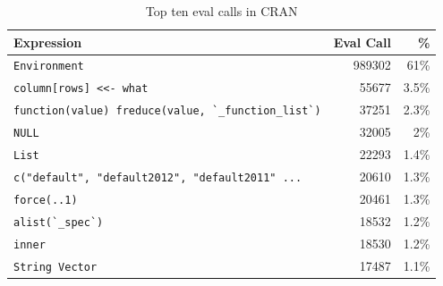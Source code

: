 \documentclass[a4paper,USenglish,cleveref, autoref, thm-restate]{lipics-v2019}
\renewcommand{\c}[1]{\lstinline{#1}\xspace}
\begin{document}
\begin{table}[!h]  \centering
\begin{tabular}{@{}l@{~}|@{~}r@{~}r@{}} \hline
Expression & Eval Call &  \% \\\hline
\c{Environment} &                                  989302   & 61\%\\
\c{column[rows] <<- what} &                        55677    & 3.5\%\\
\c{function(value) freduce(value, `_function_list`)} & 37251& 2.3\%\\
\c{NULL} &                         32005    & 2\%\\
\c{List} &                         22293    & 1.4\%\\
\c{c("default", "default2012", "default2011" ...}& 20610    & 1.3\%\\
\c{force(..1)}            &                        20461    & 1.3\%\\
\c{alist(`_spec`)}       &                         18532    & 1.2\%\\
\c{inner}               &                          18530    & 1.2\%\\
\c{String Vector}      &                           17487     & 1.1\%\\
\end{tabular}\caption{Top ten eval calls in CRAN} \label{C}
\end{table}
\end{document}
